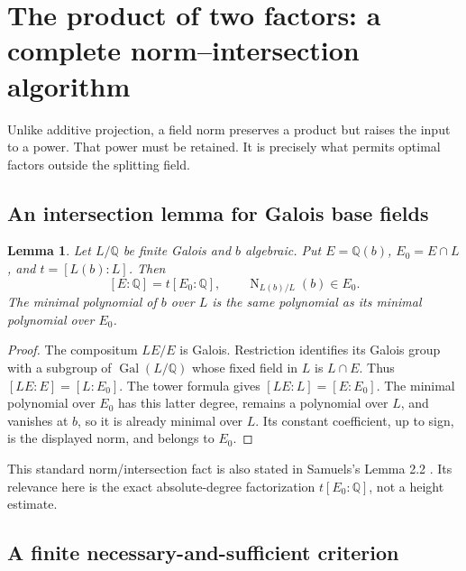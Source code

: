 \documentclass[11pt,a4paper]{article}
\newtheorem{lemma}[theorem]{Lemma}
\theoremstyle{definition}\newtheorem{definition}[theorem]{Definition}
\theoremstyle{remark}\newtheorem{remark}[theorem]{Remark}
\newcommand{\Q}{\mathbb Q}
\newcommand{\Gal}{\operatorname{Gal}}
\newcommand{\Nm}{\operatorname{N}}
\begin{document}
\section{The product of two factors: a complete norm--intersection algorithm}
\label{sec:two}

Unlike additive projection, a field norm preserves a product but raises the
input to a power. That power must be retained. It is precisely what permits
optimal factors outside the splitting field.

\subsection{An intersection lemma for Galois base fields}

\begin{lemma}\label{lem:intersection}
Let $L/\Q$ be finite Galois and $b$ algebraic. Put
$E=\Q(b)$, $E_0=E\cap L$, and $t=[L(b):L]$. Then
\[
 [E:\Q]=t[E_0:\Q],\qquad
 \Nm_{L(b)/L}(b)\in E_0.
\]
The minimal polynomial of $b$ over $L$ is the same polynomial as its minimal
polynomial over $E_0$.
\end{lemma}
\begin{proof}
The compositum $LE/E$ is Galois. Restriction identifies its Galois group
with a subgroup of $\Gal(L/\Q)$ whose fixed field in $L$ is $L\cap E$.
Thus $[LE:E]=[L:E_0]$. The tower formula gives
$[LE:L]=[E:E_0]$. The minimal polynomial over $E_0$ has this latter
degree, remains a polynomial over $L$, and vanishes at $b$, so it is already
minimal over $L$. Its constant coefficient, up to sign, is the displayed
norm, and belongs to $E_0$.
\end{proof}

This standard norm/intersection fact is also stated in Samuels's
Lemma 2.2 \cite{samuels}. Its relevance here is the exact absolute-degree
factorization $t[E_0:\Q]$, not a height estimate.

\subsection{A finite necessary-and-sufficient criterion}
\end{document}
